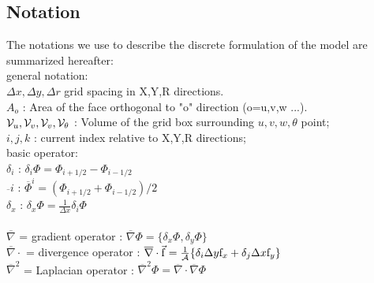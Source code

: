 
\subsection{Notation} 

The notations we use to describe the discrete formulation 
of the model are summarized hereafter:\\
general notation:
\\ $\Delta x, \Delta y, \Delta r$ grid spacing in X,Y,R directions.
\\ $A_o$ : Area of the face orthogonal to "o" direction (o=u,v,w ...).
\\ ${\cal V}_u , {\cal V}_v , {\cal V}_v , {\cal V}_\theta$ :
Volume of the grid box surrounding $u,v,w,\theta$ point;
\\ $i,j,k$ : current index relative to X,Y,R directions;
\\basic operator:
\\ $\delta_i $ : $\delta_i \Phi = \Phi_{i+1/2} - \Phi_{i-1/2} $
\label{eq:delta_i}
\\ $\overline{~}i$ : $\overline{\Phi}^i = ( \Phi_{i+1/2} + \Phi_{i-1/2} ) / 2 $ 
\label{eq:bar_i}
\\ $\delta_x $ : $\delta_x \Phi = \frac{1}{\Delta x} \delta_i \Phi $
\label{eq:delta_x}
\\
\\ $\overline{\nabla}$ = gradient operator :  
$\overline{\nabla} \Phi = \{ \delta_x \Phi , \delta_y \Phi \}$
\label{eq:d_grad}
\\ $\overline{\nabla} \cdot$ = divergence operator :  
$\overline{\nabla}\cdot \vec{\mathrm{f}}  = 
\frac{1}{\cal A} \{ \delta_i \Delta y \mathrm{f}_x 
                  + \delta_j \Delta x \mathrm{f}_y \} $
\label{eq:d_div}
\\ $\overline{\nabla}^2 $ = Laplacian operator :
$ \overline{\nabla}^2 \Phi = 
   \overline{\nabla}\cdot \overline{\nabla}\Phi $
\label{eq:d_lap}
